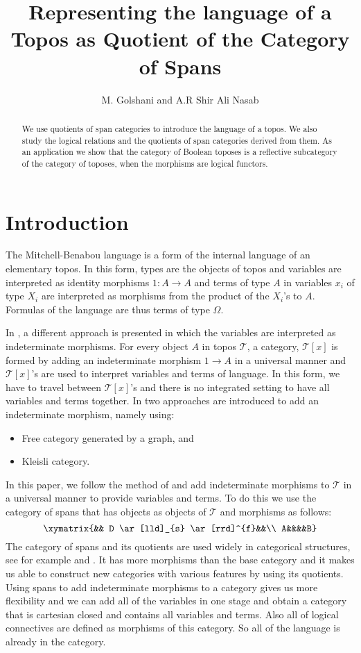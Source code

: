 \documentclass{tac}
\title{Representing the language of a Topos as Quotient of the Category of Spans}
\author{M. Golshani and A.R Shir Ali Nasab}
\theoremstyle{definition}
\theoremstyle{remark}
\def\mc#1{\mathcal {#1}}
\def\T{\mc T}
\begin{document}
 \maketitle
\begin{abstract}
We use quotients of span categories to introduce the language of a topos. We also study the  logical relations and the quotients of span categories derived from them. As an application we show that the category of Boolean toposes is a reflective subcategory of the category of toposes,
when  the morphisms are logical functors.
 \end{abstract}



\section{Introduction}

The Mitchell-Benabou language \cite{macmor} is a form of the internal language of an elementary topos. In this form, types are the objects of topos and variables are interpreted as identity morphisms $1:A\rightarrow A$ and terms of type $A$ in variables $x_i$ of type $X_i$ are interpreted as morphisms from the product of the $X_i$'s to $A$. Formulas of the language are thus terms of type $\Omega.$

	In \cite{lambscot}, a different approach is presented in which the variables are interpreted as indeterminate morphisms. For every object $A$ in topos $\mathcal T$, a category, $\mathcal T[x]$ is formed by adding an indeterminate morphism $1\rightarrow A$ in a universal manner and $\mathcal T[x]$'s are used to interpret variables and terms of language. In this form, we have to travel between $\mathcal T[x]$'s and there is no integrated setting to have all variables and terms together. In \cite{lambscot} two approaches are introduced to add an indeterminate morphism, namely using:
 \begin{itemize}
 \item Free category generated by a graph, and
	
\item Kleisli category.

\end{itemize}
	In this paper, we follow the method of \cite{lambscot} and add indeterminate morphisms to $\T$ in a universal manner to provide variables and terms. To do this we use the category of spans that has objects as objects of $\mathcal T$ and morphisms as follows:
	$$\xymatrix{&& D \ar[lld]_{s} \ar[rrd]^{f}&&\\
	A&&&&B}$$
	The category of spans and its quotients are used widely in categorical structures, see for example \cite{hoshitho} and \cite{hsty}.
	It has more morphisms than the base category and it makes us able to construct new categories with various features by using its quotients.
	Using spans to add indeterminate morphisms to a category gives us more flexibility and we can add all of the variables in one stage and obtain a category that is cartesian closed and contains all variables and terms. Also all of logical connectives are defined as morphisms of this category. So all of the language is already in the category.
	
\end{document}
